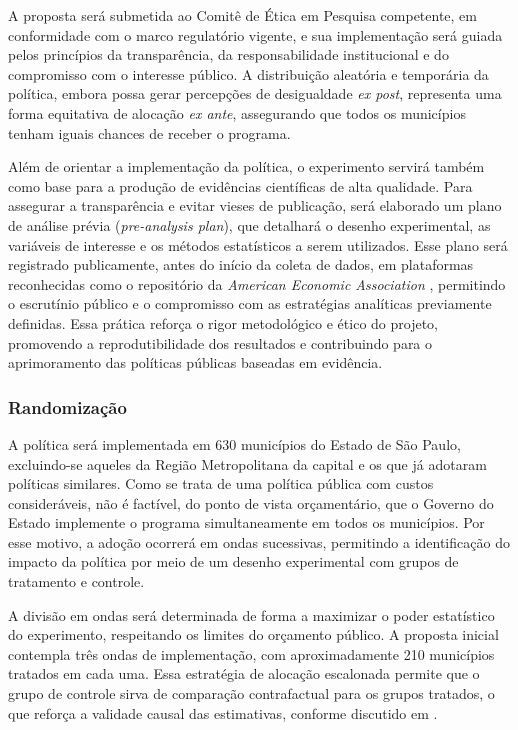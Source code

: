 A proposta será submetida ao Comitê de Ética em Pesquisa competente, em conformidade com o marco regulatório vigente, e sua implementação será guiada pelos princípios da transparência, da responsabilidade institucional e do compromisso com o interesse público. A distribuição aleatória e temporária da política, embora possa gerar percepções de desigualdade \textit{ex post}, representa uma forma equitativa de alocação \textit{ex ante}, assegurando que todos os municípios tenham iguais chances de receber o programa.


Além de orientar a implementação da política, o experimento servirá também como base para a produção de evidências científicas de alta qualidade. Para assegurar a transparência e evitar vieses de publicação, será elaborado um plano de análise prévia (\textit{pre-analysis plan}), que detalhará o desenho experimental, as variáveis de interesse e os métodos estatísticos a serem utilizados. Esse plano será registrado publicamente, antes do início da coleta de dados, em plataformas reconhecidas como o repositório da\textit{ American Economic Association} \cite{AEA_registry}, permitindo o escrutínio público e o compromisso com as estratégias analíticas previamente definidas. Essa prática reforça o rigor metodológico e ético do projeto, promovendo a reprodutibilidade dos resultados e contribuindo para o aprimoramento das políticas públicas baseadas em evidência.

\subsubsection{Randomização}

A política será implementada em 630 municípios do Estado de São Paulo, excluindo-se aqueles da Região Metropolitana da capital e os que já adotaram políticas similares. Como se trata de uma política pública com custos consideráveis, não é factível, do ponto de vista orçamentário, que o Governo do Estado implemente o programa simultaneamente em todos os municípios. Por esse motivo, a adoção ocorrerá em ondas sucessivas, permitindo a identificação do impacto da política por meio de um desenho experimental com grupos de tratamento e controle.

A divisão em ondas será determinada de forma a maximizar o poder estatístico do experimento, respeitando os limites do orçamento público. A proposta inicial contempla três ondas de implementação, com aproximadamente 210 municípios tratados em cada uma. Essa estratégia de alocação escalonada permite que o grupo de controle sirva de comparação contrafactual para os grupos tratados, o que reforça a validade causal das estimativas, conforme discutido em \cite{duflo2008toolkit}.

